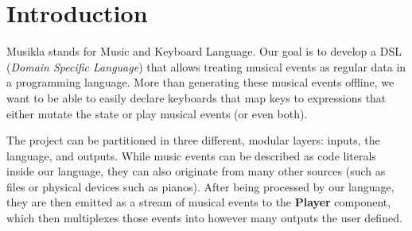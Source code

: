 \documentclass[a4paper,UKenglish,cleveref, autoref]{oasics-v2019}
\title{\ourtitle}
\author{Pedro M. Silva}{Dummy University Computing Laboratory, Portugal \and My second affiliation, Country \and \url{http://www.myhomepage.edu} }{johnqpublic@dummyuni.org}{https://orcid.org/0000-0002-1825-0097}{(Optional) author-specific funding acknowledgements}
\author{José João Almeida}%
       {Algoritmi, Departamento de Informática, Universidade do Minho, Braga, Portugal}%
       {jj@di.uminho.pt}%
       {https://orcid.org/0000-0002-0722-2031}
       {}
\begin{document}
\maketitle

\begin{abstract}
  In this paper, we'll discuss a simple approach to integrating musical events, such as notes or chords, into a programming language. This means treating music sequences as a first class citizen. It will be possible to save those sequences into variables or play them right away, pass them into functions or apply operators on them (like transposing or repeating the sequence). Furthermore, instead of just allowing static sequences to be generated, we'll integrate a music keyboard system that easily allows the user to bind keys (or other kinds of events) to expressions. Finally, it is important to provide the user with multiple and extensible ways of outputing their music, such as synthesizing it into a file or directly into the speakers, or writing a MIDI or music sheet file. We'll structure this paper first with an analysis of the problem and its particular requirements. Then we will discuss the solution we developed to meet those requirements. Finally we'll analyze the result and discuss possible alternative routes we could've taken.
\end{abstract}

\section{Introduction}
Musikla stands for Music and Keyboard Language. Our goal is to develop a DSL (\textit{Domain Specific Language}) that allows treating musical events as regular data in a programming language. More than generating these musical events offline, we want to be able to easily declare keyboards that map keys to expressions that either mutate the state or play musical events (or even both).

The project can be partitioned in three different, modular layers: inputs, the language, and outputs. While music events can be described as code literals inside our language, they can also originate from many other sources (such as files or physical devices such as pianos). After being processed by our language, they are then emitted as a stream of musical events to the \textbf{Player} component, which then multiplexes those events into however many outputs the user defined.

\end{document}
